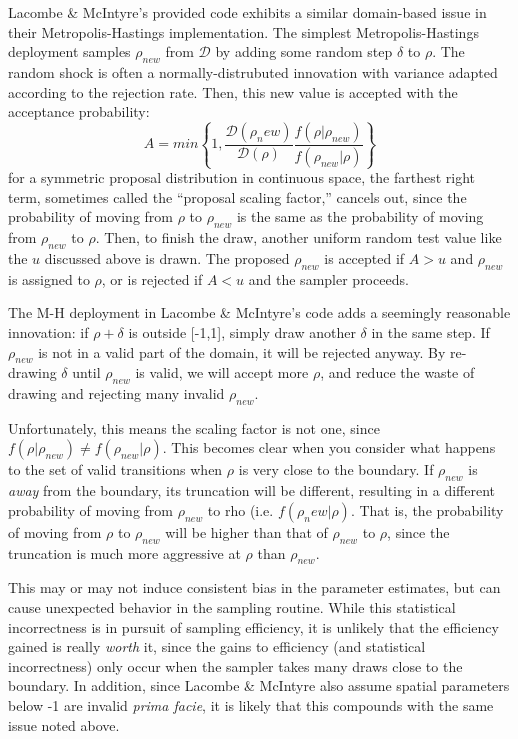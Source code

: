 \documentclass{article}
\begin{document}
Lacombe \& McIntyre's provided code exhibits a similar domain-based issue in
their Metropolis-Hastings implementation. The simplest Metropolis-Hastings
deployment samples $\rho_{new}$ from $\mathcal{D}$ by adding some random step
$\delta$ to $\rho$. The random shock is often a normally-distrubuted innovation
with variance adapted according to the rejection rate. Then, this new value is
accepted with the acceptance probability:
\[ A = min \left\{ 1, \frac{\mathcal{D}(\rho_new)}{\mathcal{D}(\rho)}
\frac{f(\rho | \rho_{new})}{f(\rho_{new} | \rho)} \right\} \] 
for a symmetric proposal distribution in continuous space, the farthest right
term, sometimes called the ``proposal scaling factor,'' cancels out, since the
probability of moving from $\rho$ to $\rho_{new}$ is the same as the probability
of moving from $\rho_{new}$ to $\rho$. Then, to finish the draw, another uniform 
random test value like the $u$ discussed above is drawn. The proposed
$\rho_{new}$ is accepted if $A > u$ and $\rho_{new}$ is assigned to $\rho$, or
is rejected if $A < u$ and the sampler proceeds. 

The M-H deployment in Lacombe \& McIntyre's code adds a seemingly reasonable
innovation: if $\rho + \delta$ is outside [-1,1], simply draw another $\delta$
in the same step. If $\rho_{new}$ is not in a valid part of the domain, it will
be rejected anyway. By re-drawing $\delta$ until $\rho_{new}$ is valid, we will
accept more $\rho$, and reduce the waste of drawing and rejecting many invalid
$\rho_{new}$. 

Unfortunately, this means the scaling factor is not one, since
$f(\rho|\rho_{new}) \neq f(\rho_{new} | \rho)$. This becomes clear when you
consider what happens to the set of valid transitions when $\rho$ is very close
to the boundary. If $\rho_{new}$ is \textit{away} from the boundary, its
truncation will be different, resulting in a different probability of moving
from $\rho_{new}$ to rho (i.e. $f(\rho_new | \rho)$. That is, the probability of
moving from $\rho$ to $\rho_{new}$ will be higher than that of $\rho_{new}$ to
$\rho$, since the truncation is much more aggressive at $\rho$ than
$\rho_{new}$. 

This may or may not induce consistent bias in the parameter estimates, but can
cause unexpected behavior in the sampling routine. While this statistical
incorrectness is in pursuit of sampling efficiency, it is unlikely that the
efficiency gained is really \textit{worth} it, since the gains to efficiency
(and statistical incorrectness) only occur when the sampler takes many draws
close to the boundary. In addition, since Lacombe \& McIntyre also assume
spatial parameters below -1 are invalid \textit{prima facie}, it is likely that
this compounds with the same issue noted above. 
\end{document}
